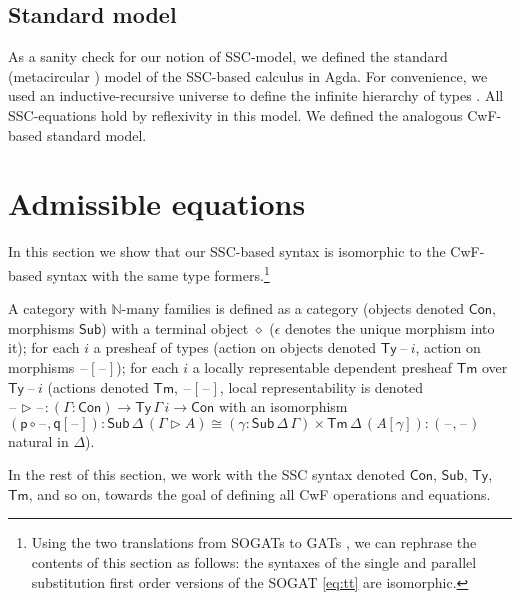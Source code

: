 \documentclass[a4paper,UKenglish,cleveref, autoref, thm-restate]{lipics-v2021}
\newcommand{\ra}{\rightarrow}
\newcommand{\Ty}{\mathsf{Ty}}
\newcommand{\Tm}{\mathsf{Tm}}
\newcommand{\Con}{\mathsf{Con}}
\newcommand{\Sub}{\mathsf{Sub}}
\newcommand{\p}{\mathsf{p}}
\newcommand{\q}{\mathsf{q}}
\newcommand{\ext}{\mathop{\triangleright}}
\newcommand{\N}{\mathbb{N}}
\newcommand{\blank}{\mathord{\hspace{1pt}\text{--}\hspace{1pt}}} %
\begin{document}
\subsection{Standard model}
\label{sec:standard}

As a sanity check for our notion of SSC-model, we defined the standard
(metacircular \cite{DBLP:conf/popl/AltenkirchK16}) model of the
SSC-based calculus in Agda. For convenience, we used an
inductive-recursive universe to define the infinite hierarchy of types
\cite{DBLP:journals/jsyml/Dybjer00,DBLP:conf/csl/Kovacs22}. All
SSC-equations hold by reflexivity in this model. We defined the
analogous CwF-based standard model.


\section{Admissible equations}
\label{sec:admissible}

In this section we show that our SSC-based syntax is isomorphic to the
CwF-based syntax with the same type formers.\footnote{Using the two translations from SOGATs to GATs
\cite{DBLP:conf/fscd/KaposiX24}, we can rephrase the contents of this
section as follows: the syntaxes of the single and parallel
substitution first order versions of the SOGAT \ref{eq:tt} are
isomorphic.}

\begin{definition}[CwF]\label{def:cwf}
  A category with $\N$-many families is defined as a category (objects
  denoted $\Con$, morphisms $\Sub$) with a terminal object $\diamond$
  ($\epsilon$ denotes the unique morphism into it); for each $i$ a
  presheaf of types (action on objects denoted $\Ty\,\blank\,i$,
  action on morphisms $\blank[\blank]$); for each $i$ a locally
  representable dependent presheaf $\Tm$ over $\Ty\,\blank\,i$
  (actions denoted $\Tm$, $\blank[\blank]$, local representability is
  denoted $\blank\ext\blank : (\Gamma:\Con)\ra\Ty\,\Gamma\,i\ra\Con$
  with an isomorphism
  $
  (\p\circ\blank,\q[\blank]) : \Sub\,\Delta\,(\Gamma\ext A) \cong (\gamma:\Sub\,\Delta\,\Gamma)\times\Tm\,\Delta\,(A[\gamma]) : (\blank,\blank)
  $
  natural in $\Delta$).
\end{definition}
In the rest of this section, we work with the SSC syntax denoted
$\Con$, $\Sub$, $\Ty$, $\Tm$, and so on, towards the goal of defining
all CwF operations and equations.
\end{document}
